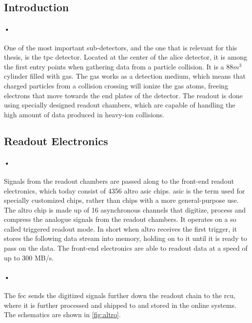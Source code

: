 \documentclass[a4paper, 12pt]{report}
\begin{document}
\subsection{Introduction}
\paragraph{•}
One of the most important sub-detectors, and the one that is relevant for this thesis, is the \gls{tpc} detector.
Located at the center of the \gls{alice} detector, it is among the first entry points when gathering data from a particle collision.
It is a 88\(m^3\) cylinder filled with gas.
The gas works as a detection medium, which means that charged particles from a collision crossing will ionize the gas atoms, freeing electrons that move towards the end plates of the detector.
The readout is done using specially designed readout chambers, which are capable of handling the high amount of data produced in heavy-ion collisions.

\subsection{Readout Electronics} %
\paragraph{•}
Signals from the readout chambers are passed along to the front-end readout electronics, which today consist of 4356 \gls{altro} \gls{asic} chips\cite{altro}.
\gls{asic} is the term used for specially customized chips, rather than chips with a more general-purpose use\cite{asic}.
The \gls{altro} chip is made up of 16 asynchronous channels that digitize, process and compress the analogue signals from the readout chambers.
It operates on a so called triggered readout mode.
In short when \gls{altro} receives the first trigger, it stores the following data stream into memory, holding on to it until it is ready to pass on the data.
The front-end electronics are able to readout data at a speed of up to 300 MB/s.
\paragraph{•}
The \gls{fec} sends the digitized signals further down the readout chain to the \gls{rcu}, where it is further processed and shipped to  and stored in the online systems.
The schematics are shown in \ref{fig:altro}.
\end{document}
